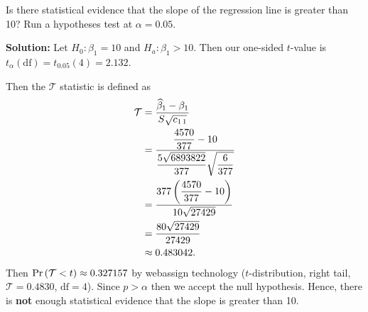 Is there statistical evidence that the slope of the regression line is greater than 10?
    Run a hypotheses test at $\alpha = 0.05$.


    \nl \textbf{Solution: } Let $H_0 : \beta_1 = 10$ and $H_a : \beta_1 > 10$. Then our one-sided $t$-value is $t_{\alpha}(\text{df}) = t_{0.05}(4) = 2.132$.

    \nl Then the $\mathcal T$ statistic is defined as
    \begin{align*}
        \mathcal T &= \frac{\widehat{\beta}_1 - \beta_1}{S\sqrt{c_{1\,1}}} \\
        &= \frac{ \dfrac{4570}{377} - 10}{\dfrac{5\sqrt{6893822}}{377} \sqrt{\dfrac{6}{377}}}\\
        &= \frac{377 \left( { \dfrac{4570}{377} - 10} \right)}{10\sqrt{27429}}\\
        &= \frac{80\sqrt{27429}}{27429}\\
        &\approx 0.483042.
    \end{align*}
    Then $\Pr \left( {\mathcal T < t} \right) \approx 0.327157$ by webassign technology ($t$-distribution, right tail, \\$\mathcal T = 0.4830$, $\text{df} = 4$). Since $p > \alpha$ then we accept the null hypothesis. Hence, there is \textbf{not} enough statistical evidence that the slope is greater than 10.